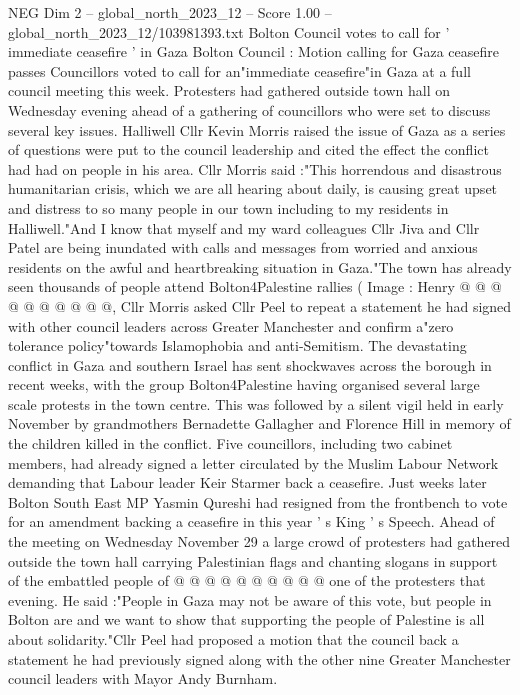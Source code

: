 \begin{textsample}{NEG Dim 2 – global\_north\_2023\_12 – Score 1.00 – global\_north\_2023\_12/103981393.txt}  \label{ex:f2_neg_212}
Bolton Council votes to call for ' immediate ceasefire ' in Gaza Bolton Council : Motion calling for Gaza ceasefire passes Councillors voted to call for an"immediate ceasefire"in Gaza at a full council meeting this week.
Protesters had gathered outside town hall on Wednesday evening ahead of a gathering of councillors who were set to discuss several key issues.
Halliwell Cllr Kevin Morris raised the issue of Gaza as a series of questions were put to the council leadership and cited the effect the conflict had had on people in his area.
Cllr Morris said :"This horrendous and disastrous humanitarian crisis, which we are all hearing about daily, is causing great upset and distress to so many people in our town including to my residents in Halliwell."And I know that myself and my ward colleagues Cllr Jiva and Cllr Patel are being inundated with calls and messages from worried and anxious residents on the awful and heartbreaking situation in Gaza."The town has already seen thousands of people attend Bolton4Palestine rallies ( Image : Henry @ @ @ @ @ @ @ @ @ @, Cllr Morris asked Cllr Peel to repeat a statement he had signed with other council leaders across Greater Manchester and confirm a"zero tolerance policy"towards Islamophobia and anti-Semitism.
The devastating conflict in Gaza and southern Israel has sent shockwaves across the borough in recent weeks, with the group Bolton4Palestine having organised several large scale protests in the town centre.
This was followed by a silent vigil held in early November by grandmothers Bernadette Gallagher and Florence Hill in memory of the children killed in the conflict.
Five councillors, including two cabinet members, had already signed a letter circulated by the Muslim Labour Network demanding that Labour leader Keir Starmer back a ceasefire.
Just weeks later Bolton South East MP Yasmin Qureshi had resigned from the frontbench to vote for an amendment backing a ceasefire in this year ' s King ' s Speech.
Ahead of the meeting on Wednesday November 29 a large crowd of protesters had gathered outside the town hall carrying Palestinian flags and chanting slogans in support of the embattled people of @ @ @ @ @ @ @ @ @ @ one of the protesters that evening.
He said :"People in Gaza may not be aware of this vote, but people in Bolton are and we want to show that supporting the people of Palestine is all about solidarity."Cllr Peel had proposed a motion that the council back a statement he had previously signed along with the other nine Greater Manchester council leaders with Mayor Andy Burnham.

\end{textsample}
